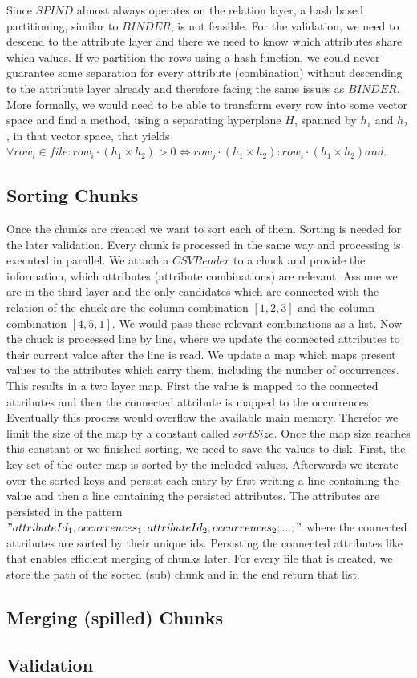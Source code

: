 \noindent Since $SPIND$ almost always operates on the relation layer, a hash based partitioning, similar to $BINDER$, is not feasible. For the validation, we need to descend to the attribute layer and there we need to know which attributes share which values. If we partition the rows using a hash function, we could never guarantee some separation for every attribute (combination) without descending to the attribute layer already and therefore facing the same issues as $BINDER$. More formally, we would need to be able to transform every row into some vector space and find a method, using a separating hyperplane $H$, spanned by $h_1$ and $h_2$, in that vector space, that yields $\forall row_i \in file : row_i \cdot (h_1 \times h_2) > 0 \iff row_j \cdot (h_1 \times h_2) : row_i \cdot (h_1 \times h_2) and $.

\subsection{Sorting Chunks}
Once the chunks are created we want to sort each of them. Sorting is needed for the later validation. Every chunk is processed in the same way and processing is executed in parallel. We attach a $CSVReader$ to a chuck and provide the information, which attributes (attribute combinations) are relevant. Assume we are in the third layer and the only candidates which are connected with the relation of the chuck are the column combination $[1, 2, 3]$ and the column combination $[4, 5, 1]$. We would pass these relevant combinations as a list. Now the chuck is processed line by line, where we update the connected attributes to their current value after the line is read. We update a map which maps present values to the attributes which carry them, including the number of occurrences. This results in a two layer map. First the value is mapped to the connected attributes and then the connected attribute is mapped to the occurrences. Eventually this process would overflow the available main memory. Therefor we limit the size of the map by a constant called $sortSize$. Once the map size reaches this constant or we finished sorting, we need to save the values to disk. First, the key set of the outer map is sorted by the included values. Afterwards we iterate over the sorted keys and persist each entry by first writing a line containing the value and then a line containing the persisted attributes. The attributes are persisted in the pattern $"attributeId_1,occurrences_1;attributeId_2,occurrences_2;...;"$ where the connected attributes are sorted by their unique ids. Persisting the connected attributes like that enables efficient merging of chunks later. For every file that is created, we store the path of the sorted (sub) chunk and in the end return that list.

\subsection{Merging (spilled) Chunks}

\subsection{Validation}